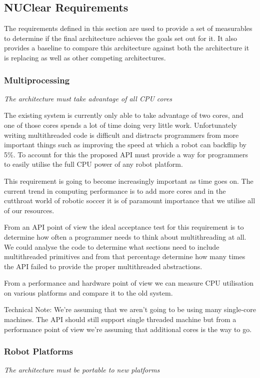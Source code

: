 \documentclass[english,12pt]{scrartcl}
\newcommand{\requirement}[1]{\textit{#1}}
\begin{document}
		\subsection{NUClear Requirements}
		The requirements defined in this section are used to provide a set of measurables to determine if the final architecture achieves the goals set out for it.
		It also provides a baseline to compare this architecture against both the architecture it is replacing as well as other competing architectures.
			\subsubsection{Multiprocessing}
				\requirement{The architecture must take advantage of all CPU cores}
	
				The existing system is currently only able to take advantage of two cores, and one of
				those cores spends a lot of time doing very little work. Unfortunately writing
				multithreaded code is difficult and distracts programmers from more important things
				such as improving the speed at which a robot can backflip by 5\%. To account for this
				the proposed API must provide a way for programmers to easily utilise the full CPU power
				of any robot platform.
	
				This requirement is going to become increasingly important as time goes on. The current
				trend in computing performance is to add more cores and in the cutthroat world of
				robotic soccer it is of paramount importance that we utilise all of our resources.
	
				From an API point of view the ideal acceptance test for this requirement is to determine
				how often a programmer needs to think about multithreading at all. We could analyse the
				code to determine what sections need to include multithreaded primitives and from that
				percentage determine how many times the API failed to provide the proper multithreaded
				abstractions.
	
				From a performance and hardware point of view we can measure CPU utilisation on various
				platforms and compare it to the old system.
	
				Technical Note: We're assuming that we aren't going to be using many single-core
				machines. The API should still support single threaded machine but from a performance
				point of view we're assuming that additional cores is the way to go.

			\subsubsection{Robot Platforms}
				\requirement{The architecture must be portable to new platforms}
	
\end{document}
